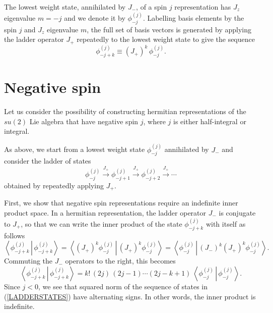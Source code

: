 \documentclass[a4paper,dvips,12pt]{article}
\newcommand {\braket}[2] {\left< { \left. #1 \,\right|} \,#2 \right>}
\begin{document}
    The lowest weight state, annihilated by $J_-$, of a spin $j$ representation
    has $J_z$ eigenvalue $m = -j$ and we denote it by $\phi_{-j}^{(j)}$.
    Labelling basis elements by
    the spin $j$ and
    $J_z$ eigenvalue $m$, the full set of basis vectors is generated by
    applying the ladder operator $J_+$ repeatedly to the lowest
    weight state to give the sequence
    \[
        \phi_{-j + k}^{(j)} \equiv (J_+)^k \,\phi_{-j}^{(j)}.
    \]

    \section{Negative spin}

    Let us consider the possibility of constructing hermitian representations
    of the $su(2)$ Lie algebra that have negative spin $j$, where $j$ is either
    half-integral or integral.

    As above, we start from a lowest weight state
    $\phi_{-j}^{(j)}$ annihilated by $J_-$
    and consider the ladder of states
    \begin{equation}
        \phi_{-j}^{(j)} \stackrel{J_+}{\longrightarrow} \phi_{-j+1}^{(j)}
        \stackrel{J_+}{\longrightarrow}
        \phi_{-j+2}^{(j)} \stackrel{J_+}{\longrightarrow} \cdots \label{LADDERSTATES}
    \end{equation}
    obtained by repeatedly applying $J_+$.

    First, we show that negative
    spin representations require an indefinite inner product space.
    In a hermitian representation, the ladder
    operator $J_-$ is conjugate to $J_+$, so that we can
    write the inner product of the state $\phi_{-j + k}^{(j)}$ with
    itself as follows
    \[
      \braket{\phi_{-j + k}^{(j)}} {\phi_{-j + k}^{(j)}} =
        \braket {(J_+)^k \phi_{-j}^{(j)}}
        {(J_+)^k \phi_{-j}^{(j)}}
        = \braket{\phi_{-j}^{(j)}}
        {(J_-)^k(J_+)^k \phi_{-j}^{(j)}}.
    \]
    Commuting the $J_-$ operators to the right, this becomes
    \begin{equation}
        \braket{\phi_{-j + k}^{(j)}} {\phi_{-j + k}^{(j)}}
        = k! \, (2j)\,(2j - 1)\cdots(2j-k+1)\,
        \braket{\phi_{-j}^{(j)}}
        {\phi_{-j}^{(j)}}.
    \end{equation}
    Since $j < 0$, we see that squared norm of
    the sequence of states in (\ref{LADDERSTATES})
    have alternating signs.
    In other words, the inner product is indefinite.
\end{document}
